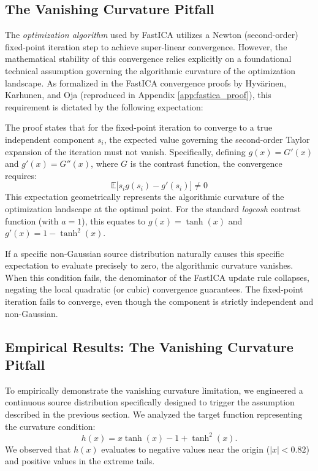 \documentclass[12pt,a4paper,twoside,openany]{book}
\begin{document}
\subsection{The Vanishing Curvature Pitfall}
The \textit{optimization algorithm} used by FastICA utilizes a Newton (second-order) fixed-point iteration step to achieve super-linear convergence. 
However, the mathematical stability of this convergence relies explicitly on a foundational technical assumption governing 
the algorithmic curvature of the optimization landscape. As formalized in the FastICA convergence proofs 
by Hyv{\"a}rinen, Karhunen, and Oja \cite[Chapter 8]{hyvarinen2001} (reproduced in Appendix \ref{app:fastica_proof}), 
this requirement is dictated by the following expectation:

The proof states that for the fixed-point iteration to converge to a true independent component $s_i$, 
the expected value governing the second-order Taylor expansion of the iteration must not vanish. 
Specifically, defining $g(x) = G'(x)$ and $g'(x) = G''(x)$, where $G$ is the contrast function, the convergence requires:
\begin{equation}
    \mathbb{E}\big[s_i g(s_i) - g'(s_i)\big] \neq 0
\end{equation}
This expectation geometrically represents the algorithmic curvature of the optimization landscape at the optimal point. 
For the standard \textit{logcosh} contrast function (with $a=1$), this equates to $g(x) = \tanh(x)$ and $g'(x) = 1 - \tanh^2(x)$. 

If a specific non-Gaussian source distribution naturally causes this specific expectation to evaluate precisely to zero, 
the algorithmic curvature vanishes. When this condition fails, the denominator of the FastICA update rule collapses, 
negating the local quadratic (or cubic) convergence guarantees. The fixed-point iteration fails to converge, 
even though the component is strictly independent and non-Gaussian.

\subsection{Empirical Results: The Vanishing Curvature Pitfall}
To empirically demonstrate the vanishing curvature limitation, we engineered a continuous source distribution specifically designed to trigger the assumption 
described in the previous section. 
We analyzed the target function representing the curvature condition: 
\begin{equation}
    h(x) = x \tanh(x) - 1 + \tanh^2(x).
\end{equation}
We observed that $h(x)$ evaluates to negative values near the origin ($|x| < 0.82$) and positive values in the extreme tails. 
\end{document}
